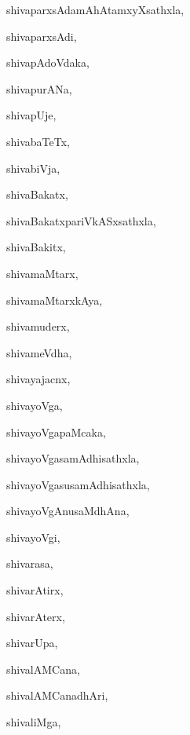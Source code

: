 \begin{multicols}{3}
{\noindent
{shivaparxsAdamAhAtamxyXsathxla}, \pageref{shivaparxsAdamAhAtamxyXsathxla}

\noindent
{shivaparxsAdi}, \pageref{shivaparxsAdi}

\noindent
{shivapAdoVdaka}, \pageref{shivapAdoVdaka}

\noindent
{shivapurANa}, \pageref{shivapurANa}

\noindent
{shivapUje}, \pageref{shivapUje}

\noindent
{shivabaTeTx}, \pageref{shivabaTeTx}

\noindent
{shivabiVja}, \pageref{shivabiVja}

\noindent
{shivaBakatx}, \pageref{shivaBakatx}

\noindent
{shivaBakatxpariVkASxsathxla}, \pageref{shivaBakatxpariVkASxsathxla}

\noindent
{shivaBakitx}, \pageref{shivaBakitx}

\noindent
{shivamaMtarx}, \pageref{shivamaMtarx}

\noindent
{shivamaMtarxkAya}, \pageref{shivamaMtarxkAya}

\noindent
{shivamuderx}, \pageref{shivamuderx}

\noindent
{shivameVdha}, \pageref{shivameVdha}

\noindent
{shivayajacnx}, \pageref{shivayajacnx}

\noindent
{shivayoVga}, \pageref{shivayoVga}

\noindent
{shivayoVgapaMcaka}, \pageref{shivayoVgapaMcaka}

\noindent
{shivayoVgasamAdhisathxla}, \pageref{shivayoVgasamAdhisathxla}

\noindent
{shivayoVgasusamAdhisathxla}, \pageref{shivayoVgasusamAdhisathxla}

\noindent
{shivayoVgAnusaMdhAna}, \pageref{shivayoVgAnusaMdhAna}

\noindent
{shivayoVgi}, \pageref{shivayoVgi}

\noindent
{shivarasa}, \pageref{shivarasa}

\noindent
{shivarAtirx}, \pageref{shivarAtirx}

\noindent
{shivarAterx}, \pageref{shivarAterx}

\noindent
{shivarUpa}, \pageref{shivarUpa}

\noindent
{shivalAMCana}, \pageref{shivalAMCana}

\noindent
{shivalAMCanadhAri}, \pageref{shivalAMCanadhAri}

\noindent
{shivaliMga}, \pageref{shivaliMga}

}
\end{multicols}
